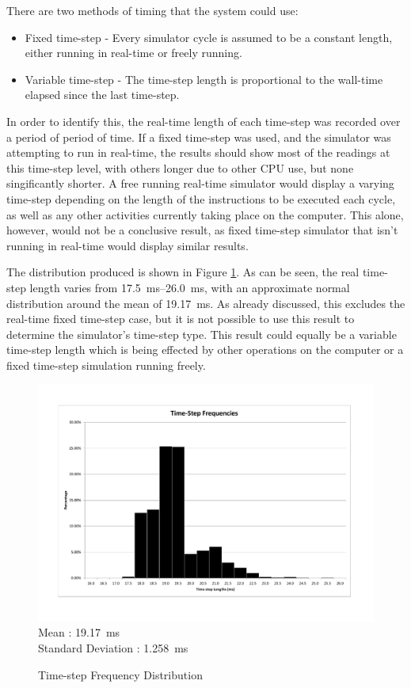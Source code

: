 \documentclass[10pt]{article}
\begin{document}
There are two methods of timing that the system could use:
\begin{itemize}
 \item Fixed time-step - Every simulator cycle is assumed to be a constant
 length, either running in real-time or freely running.
 \item Variable time-step - The time-step length is proportional to the
 wall-time elapsed since the last time-step.
\end{itemize}

In order to identify this, the real-time length of each time-step was recorded
over a period of period of time.  If a fixed time-step was used, and the
simulator was attempting to run in real-time, the results should show most of
the readings at this time-step level, with others longer due to other CPU
use, but none singificantly shorter.  A free running real-time simulator would
display a varying time-step depending on the length of the instructions to be
executed each cycle, as well as any other activities currently taking place on
the computer.  This alone, however, would not be a conclusive result, as fixed
time-step simulator that isn't running in real-time would display similar
results.

The distribution produced is shown in Figure \ref{fig:timestepDistribution}.  As
can be seen, the real time-step length varies from
\SIrange{17.5}{26.0}{\milli\second}, with an approximate normal distribution
around the mean of \SI{19.17}{\milli\second}.  As already discussed, this
excludes the real-time fixed time-step case, but it is not possible to use this
result to determine the simulator's time-step type. This result could equally be
a variable time-step length which is being effected by other operations on the
computer or a fixed time-step simulation running freely.

\begin{figure}
 \includegraphics[width=\textwidth]{Images/time-step-length-distribution} \\
 Mean : \SI{19.17}{\milli\second} \\
 Standard Deviation : \SI{1.258}{\milli\second}

 \caption{Time-step Frequency Distribution}
 \label{fig:timestepDistribution}
\end{figure}
\end{document}
